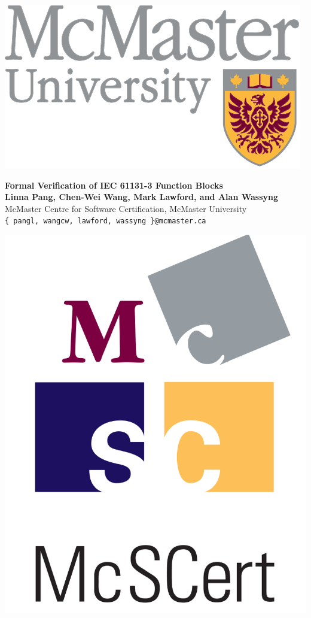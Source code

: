 \documentclass[a0,landscape]{a0poster}
\begin{document}
\begin{minipage}[b]{0.2\linewidth}
\centering
\includegraphics[width=.75\linewidth]{logos/mcmaster_logo}  
\end{minipage}
%
\begin{minipage}[b]{0.6\linewidth}
\centering
\veryHuge \color{Blue} \textbf{Formal Verification of IEC 61131-3 Function Blocks} \color{Black}  \\ [1cm]
\huge \textbf{Linna Pang, Chen-Wei Wang, Mark Lawford, and Alan Wassyng} \\ 
\huge McMaster Centre for Software Certification, McMaster University \\
\LARGE \texttt{\{~pangl, wangcw, lawford, wassyng~\}@mcmaster.ca}
\end{minipage}
%
\begin{minipage}[b]{0.2\linewidth}
\centering
\includegraphics[width=.45\linewidth]{logos/McScert_logo4}
\end{minipage}

\vspace{1cm} 
\end{document}
